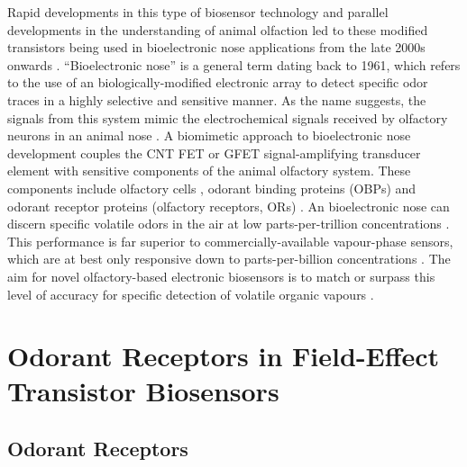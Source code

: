 \documentclass[
  a4paper,
]{scrbook}
\begin{document}
Rapid developments in this type of biosensor technology and parallel
developments in the understanding of animal olfaction led to these
modified transistors being used in bioelectronic nose applications from
the late 2000s onwards \autocite{Yoon2009,Jin2012,Lee2012b,Park2012}.
``Bioelectronic nose'' is a general term dating back to 1961, which
refers to the use of an biologically-modified electronic array to detect
specific odor traces in a highly selective and sensitive manner. As the
name suggests, the signals from this system mimic the electrochemical
signals received by olfactory neurons in an animal nose
\autocite{Glatz2011,Dung2018}. A biomimetic approach to bioelectronic
nose development couples the CNT FET or GFET signal-amplifying
transducer element with sensitive components of the animal olfactory
system. These components include olfactory cells \autocite{Wang2007},
odorant binding proteins (OBPs) \autocite{Larisika2015,Kotlowski2018}
and odorant receptor proteins (olfactory receptors, ORs)
\autocite{Yang2018,Murugathas2020}. An bioelectronic nose can discern
specific volatile odors in the air at low parts-per-trillion
concentrations \autocite{Lee2010,Moon2020}. This performance is far
superior to commercially-available vapour-phase sensors, which are at
best only responsive down to parts-per-billion concentrations
\autocite{GasDetector1,GasDetector2}. The aim for novel olfactory-based
electronic biosensors is to match or surpass this level of accuracy for
specific detection of volatile organic vapours
\autocite{Glatz2011,Kwon2015,Dung2018,Bohbot2020,Kim2022a}.

\hypertarget{sec-odorant-receptors-biosensors}{%
\section{Odorant Receptors in Field-Effect Transistor
Biosensors}\label{sec-odorant-receptors-biosensors}}

\hypertarget{sec-odorant-receptors}{%
\subsection{Odorant Receptors}\label{sec-odorant-receptors}}
\end{document}
